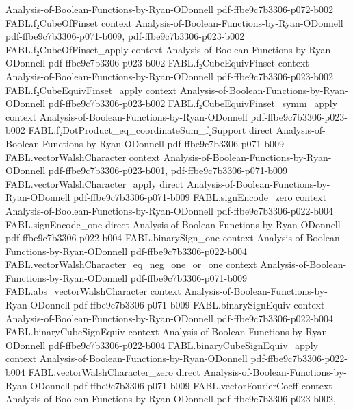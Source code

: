 \begin{theorem}
  {Analysis-of-Boolean-Functions-by-Ryan-ODonnell}
  {pdf-ffbe9c7b3306-p072-b002}
\proofstep
  {FABL.f₂CubeOfFinset}
  {context}
  {Analysis-of-Boolean-Functions-by-Ryan-ODonnell}
  {pdf-ffbe9c7b3306-p071-b009,
    pdf-ffbe9c7b3306-p023-b002}
\proofstep
  {FABL.f₂CubeOfFinset_apply}
  {context}
  {Analysis-of-Boolean-Functions-by-Ryan-ODonnell}
  {pdf-ffbe9c7b3306-p023-b002}
\proofstep
  {FABL.f₂CubeEquivFinset}
  {context}
  {Analysis-of-Boolean-Functions-by-Ryan-ODonnell}
  {pdf-ffbe9c7b3306-p023-b002}
\proofstep
  {FABL.f₂CubeEquivFinset_apply}
  {context}
  {Analysis-of-Boolean-Functions-by-Ryan-ODonnell}
  {pdf-ffbe9c7b3306-p023-b002}
\proofstep
  {FABL.f₂CubeEquivFinset_symm_apply}
  {context}
  {Analysis-of-Boolean-Functions-by-Ryan-ODonnell}
  {pdf-ffbe9c7b3306-p023-b002}
\proofstep
  {FABL.f₂DotProduct_eq_coordinateSum_f₂Support}
  {direct}
  {Analysis-of-Boolean-Functions-by-Ryan-ODonnell}
  {pdf-ffbe9c7b3306-p071-b009}
\proofstep
  {FABL.vectorWalshCharacter}
  {context}
  {Analysis-of-Boolean-Functions-by-Ryan-ODonnell}
  {pdf-ffbe9c7b3306-p023-b001,
    pdf-ffbe9c7b3306-p071-b009}
\proofstep
  {FABL.vectorWalshCharacter_apply}
  {direct}
  {Analysis-of-Boolean-Functions-by-Ryan-ODonnell}
  {pdf-ffbe9c7b3306-p071-b009}
\proofstep
  {FABL.signEncode_zero}
  {context}
  {Analysis-of-Boolean-Functions-by-Ryan-ODonnell}
  {pdf-ffbe9c7b3306-p022-b004}
\proofstep
  {FABL.signEncode_one}
  {direct}
  {Analysis-of-Boolean-Functions-by-Ryan-ODonnell}
  {pdf-ffbe9c7b3306-p022-b004}
\proofstep
  {FABL.binarySign_one}
  {context}
  {Analysis-of-Boolean-Functions-by-Ryan-ODonnell}
  {pdf-ffbe9c7b3306-p022-b004}
\proofstep
  {FABL.vectorWalshCharacter_eq_neg_one_or_one}
  {context}
  {Analysis-of-Boolean-Functions-by-Ryan-ODonnell}
  {pdf-ffbe9c7b3306-p071-b009}
\proofstep
  {FABL.abs_vectorWalshCharacter}
  {context}
  {Analysis-of-Boolean-Functions-by-Ryan-ODonnell}
  {pdf-ffbe9c7b3306-p071-b009}
\proofstep
  {FABL.binarySignEquiv}
  {context}
  {Analysis-of-Boolean-Functions-by-Ryan-ODonnell}
  {pdf-ffbe9c7b3306-p022-b004}
\proofstep
  {FABL.binaryCubeSignEquiv}
  {context}
  {Analysis-of-Boolean-Functions-by-Ryan-ODonnell}
  {pdf-ffbe9c7b3306-p022-b004}
\proofstep
  {FABL.binaryCubeSignEquiv_apply}
  {context}
  {Analysis-of-Boolean-Functions-by-Ryan-ODonnell}
  {pdf-ffbe9c7b3306-p022-b004}
\proofstep
  {FABL.vectorWalshCharacter_zero}
  {direct}
  {Analysis-of-Boolean-Functions-by-Ryan-ODonnell}
  {pdf-ffbe9c7b3306-p071-b009}
\proofstep
  {FABL.vectorFourierCoeff}
  {context}
  {Analysis-of-Boolean-Functions-by-Ryan-ODonnell}
  {pdf-ffbe9c7b3306-p023-b002,
}
\end{theorem}

